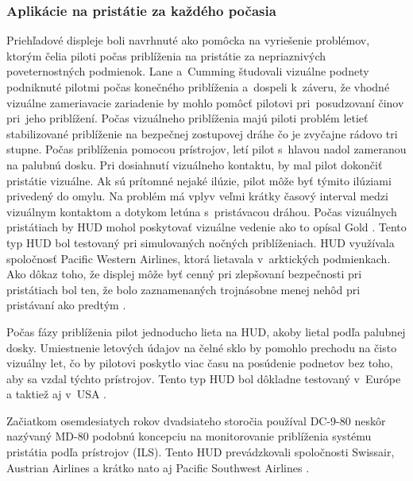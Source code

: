 \subsubsection{Aplikácie na pristátie za každého počasia}
Priehľadové displeje boli navrhnuté ako pomôcka na vyriešenie problémov, ktorým čelia piloti počas priblíženia na pristátie za nepriaznivých poveternostných podmienok. Lane a~Cumming študovali vizuálne podnety podniknuté pilotmi počas konečného priblíženia a~dospeli k~záveru, že vhodné vizuálne zameriavacie zariadenie by mohlo pomôcť pilotovi pri~posudzovaní činov pri~jeho priblížení. Počas vizuálneho priblíženia majú piloti problém letieť stabilizované priblíženie na bezpečnej zostupovej dráhe čo je zvyčajne rádovo tri stupne. Počas priblíženia pomocou prístrojov, letí pilot s~hlavou nadol zameranou na palubnú dosku. Pri dosiahnutí vizuálneho kontaktu, by mal pilot dokončiť pristátie vizuálne. Ak sú prítomné nejaké ilúzie, pilot môže byť týmito ilúziami privedený do omylu. Na problém má vplyv veľmi krátky časový interval medzi vizuálnym kontaktom a dotykom letúna s~pristávacou dráhou. Počas vizuálnych pristátiach by HUD mohol poskytovať vizuálne vedenie ako to opísal Gold \cite{4502188}. Tento typ HUD bol testovaný pri simulovaných nočných priblíženiach. HUD využívala spoločnosť Pacific Western Airlines, ktorá lietavala v~arktických podmienkach. Ako dôkaz toho, že displej môže byť cenný pri zlepšovaní bezpečnosti pri pristátiach bol ten, že bolo zaznamenaných trojnásobne menej nehôd pri pristávaní ako predtým \cite{HUDkniha}.

Počas fázy priblíženia pilot jednoducho lieta na HUD, akoby lietal podľa palubnej dosky. Umiestnenie letových údajov na čelné sklo by pomohlo prechodu na čisto vizuálny let, čo by pilotovi poskytlo viac času na posúdenie podnetov bez toho, aby sa vzdal týchto prístrojov. Tento typ HUD bol dôkladne testovaný v~Európe a taktiež aj v~USA \cite{HUDkniha}.

Začiatkom osemdesiatych rokov dvadsiateho storočia používal DC-9-80 neskôr nazývaný MD-80 podobnú koncepciu na monitorovanie priblíženia systému pristátia podľa prístrojov (ILS). Tento HUD prevádzkovali spoločnosti Swissair, Austrian Airlines a krátko nato aj Pacific Southwest Airlines \cite{HUDkniha}.


